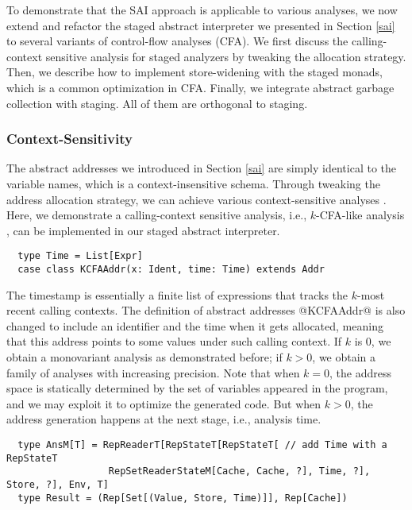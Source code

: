 To demonstrate that the SAI approach is applicable to various analyses, we now
extend and refactor the staged abstract interpreter we presented in Section
\ref{sai} to several variants of control-flow analyses (CFA). We first discuss
the calling-context sensitive analysis for staged analyzers by tweaking the
allocation strategy. Then, we describe how to implement store-widening with the
staged monads, which is a common optimization in CFA. Finally, we integrate
abstract garbage collection with staging. All of them are orthogonal to
staging.

\subsubsection{Context-Sensitivity}

The abstract addresses we introduced in Section \ref{sai} are simply identical
to the variable names, which is a context-insensitive schema.  Through tweaking
the address allocation strategy, we can achieve various context-sensitive
analyses \cite{DBLP:conf/icfp/Gilray0M16}. Here, we demonstrate a
calling-context sensitive analysis, i.e., $k$-CFA-like analysis
\cite{DBLP:journals/jfp/HornM12}, can be implemented in our staged abstract
interpreter.
\begin{lstlisting}
  type Time = List[Expr]
  case class KCFAAddr(x: Ident, time: Time) extends Addr
\end{lstlisting}

The timestamp is essentially a finite list of expressions that tracks the $k$-most
recent calling contexts. The definition of abstract addresses @KCFAAddr@ is also
changed to include an identifier and the time when it gets allocated, meaning that
this address points to some values under such calling context. If $k$ is 0, we
obtain a monovariant analysis as demonstrated before; if $k > 0$, we obtain a
family of analyses with increasing precision. Note that when $k = 0$, the
address space is statically determined by the set of variables appeared in the
program, and we may exploit it to optimize the generated code. But when $k > 0$,
the address generation happens at the next stage, i.e., analysis time.
\begin{lstlisting}
  type AnsM[T] = RepReaderT[RepStateT[RepStateT[ // add Time with a RepStateT
                  RepSetReaderStateM[Cache, Cache, ?], Time, ?], Store, ?], Env, T]
  type Result = (Rep[Set[(Value, Store, Time)]], Rep[Cache])
\end{lstlisting}

